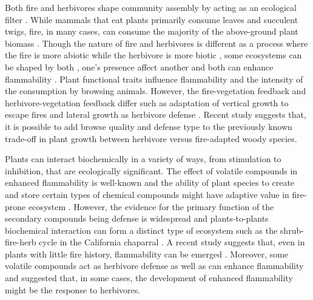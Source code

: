 \documentclass[12pt]{report}
\begin{document}
Both fire and herbivores shape community assembly by acting as an ecological filter \citep{belsky1992effects, grazingecologicalfilters, morphospace, verdu2007ecologicalfilter,fireecologicalfitlers}. While mammals that eat plants primarily consume leaves and succulent twigs, fire, in many cases, can consume the majority of the above-ground plant biomass \citep{bond1996fire,globalherbivore}. Though the nature of fire and herbivores is different as a process where the fire is more abiotic while the herbivore is more biotic  \citep{globalherbivore,archibald2019unified}, some ecosystems can be shaped by both \citep{van2003effects,  archibald2005shaping,staver2009browsing,donaldson2018ecological, noy1995interactive}, one's presence affect another\citep{holdo2009grazers, foster2015synergistic} and both can enhance flammability \citep{white1994monoterpenes, owens1998seasonal, Ulex}. Plant functional traits influence flammability and the intensity of the consumption by browsing animals. However, the fire-vegetation feedback and herbivore-vegetation feedback differ such as adaptation of vertical growth to escape fires and lateral growth as herbivore defense \citep{archibald2003growing,staver2012top,moncrieff2011tree}. Recent study \citep{wigley2015mammal} suggests that, it is possible to add browse quality and defense type to the previously known trade-off in plant growth between herbivore versus fire-adapted woody species.

Plants can interact biochemically in a variety of ways, from stimulation to inhibition, that are ecologically significant\citep{muller1966role}. The effect of volatile compounds in enhanced flammability is well-known \citep{mutch1970wildland,white1994monoterpenes,owens1998seasonal,volatile1,volatile2,volatile3,alam2020shoot,ormeno2009relationship} and the ability of plant species to create and store certain types of chemical compounds might have adaptive value in fire-prone ecosystem \citep{pausas2016secondary}. However, the evidence for the primary function of the secondary compounds being defense is widespread \citep{primaryfunction} and plants-to-plants biochemical interaction can form a distinct type of ecosystem such as the shrub-fire-herb cycle in the California chaparral \citep{allelopathic}. A recent study suggests that, even in plants with little fire history, flammability can be emerged \citep{cui2020shoot}. Moreover, some volatile compounds act as herbivore defense as well as can enhance flammability \citep{white1994monoterpenes} and \citep{owens1998seasonal} suggested that, in some cases, the development of enhanced flammability might be the response to herbivores.
\end{document}
